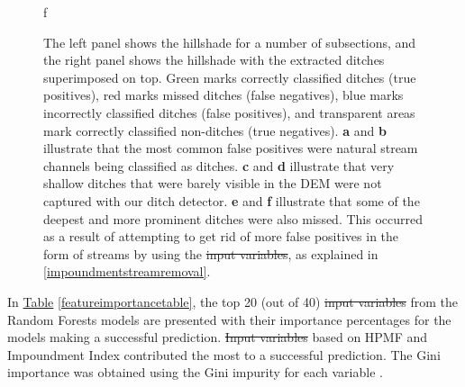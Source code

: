 \documentclass[11pt, review]{elsarticle} %
\providecommand{\DIFaddtex}[1]{{\protect\color{blue}\uwave{#1}}} %
\providecommand{\DIFdeltex}[1]{{\protect\color{red}\sout{#1}}}                      %
\providecommand{\DIFaddbegin}{} %
\providecommand{\DIFaddend}{} %
\providecommand{\DIFdelbegin}{} %
\providecommand{\DIFdelend}{} %
\providecommand{\DIFaddFL}[1]{\DIFadd{#1}} %
\providecommand{\DIFdelFL}[1]{\DIFdel{#1}} %
\providecommand{\DIFaddbeginFL}{} %
\providecommand{\DIFaddendFL}{} %
\providecommand{\DIFdelbeginFL}{} %
\providecommand{\DIFdelendFL}{} %
\providecommand{\DIFadd}[1]{\texorpdfstring{\DIFaddtex{#1}}{#1}} %
\providecommand{\DIFdel}[1]{\texorpdfstring{\DIFdeltex{#1}}{}} %
\begin{document}
\begin{figure} [!htb]
{    f}{
        }
    \DIFaddendFL \caption{The left panel shows the hillshade for a number of subsections, and the right panel shows the hillshade with the extracted ditches superimposed on top. Green marks correctly classified ditches (true positives), red marks missed ditches (false negatives), blue marks incorrectly classified ditches (false positives), and transparent areas mark correctly classified non-ditches (true negatives). \textbf{a} and \textbf{b} illustrate that the most common false positives were natural stream channels being classified as ditches. \textbf{c} and \textbf{d} illustrate that very shallow ditches that were barely visible in the DEM were not captured with our ditch detector. \textbf{e} and \textbf{f} illustrate that some of the deepest and more prominent ditches were also missed. This occurred as a result of attempting to get rid of more false positives in the form of streams by using the \DIFdelbeginFL \DIFdelFL{input variables}\DIFdelendFL \DIFaddbeginFL \DIFaddFL{features}\DIFaddendFL , as explained in \ref{impoundmentstreamremoval}.}
    \label{fig:resultsillustrations}
\end{figure}
\DIFdelbegin %
\DIFdelend 

In \hyperref[featureimportancetable]{Table} \ref{featureimportancetable}, the top 20 (out of 40) \DIFdelbegin \DIFdel{input variables }\DIFdelend \DIFaddbegin \DIFadd{features }\DIFaddend from the Random Forests models are presented with their importance percentages for the models making a successful prediction. \DIFdelbegin \DIFdel{Input variables }\DIFdelend \DIFaddbegin \DIFadd{features }\DIFaddend based on HPMF and Impoundment Index contributed the most to a successful prediction. The Gini importance was obtained using the Gini impurity for each variable \citep{gini}.
\end{document}
